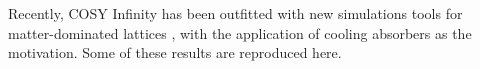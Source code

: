 \documentclass[portrait,a0paper,fontscale=0.285]{baposter} %
\begin{document}
\begin{poster}



{

Recently, COSY Infinity \cite{cosy} has been outfitted with new simulations tools for matter-dominated lattices \cite{ipac2015}, with the application of cooling absorbers as the motivation. Some of these results are reproduced here.
\\

}
\end{poster}
\end{document}
